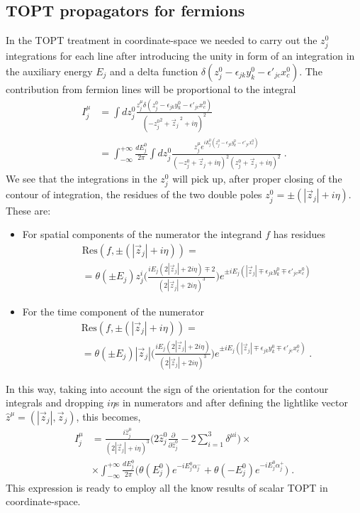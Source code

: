 \documentclass[%
 reprint,
 amsmath,amssymb,
 aps,
]{revtex4-1}
\begin{document}
\subsection{TOPT propagators for fermions}
In the TOPT treatment in coordinate-space we needed to carry out the $z^0_j$ integrations for each line after introducing the unity in form of an integration in the auxiliary energy $E_j$ and a delta function $\delta(z_j^0-\epsilon_{jk} y_k^0-\epsilon'_{jc}x_c^0)$. The contribution from fermion lines will be proportional to the integral
 \begin{align}
 I^\mu_j&=\int dz^0_{j}\frac{z_j^\mu\delta(z_{j}^0-\epsilon_{jk}y_k^0-\epsilon'_{jc}x^0_c)}{(-{z_{j}^0}^2+{\vec{z}_j}^{\;2}+i\eta)^2}\nonumber\\
 &=\int_{-\infty}^{+\infty}\frac{dE^0_j}{2\pi}\int dz^0_{j}\frac{z_j^\mu e^{iE^0_j(z_{j}^0-\epsilon_{jk}y^0_k-\epsilon'_{jc}x^0_c)}}{(-{z_{j}^0}+{\vec{z}_j}+i\eta)^2({z_{j}^0}+{\vec{z}_j}+i\eta)^2}\;.
\end{align}
We see that the integrations in the $z_j^0$ will pick up, after proper closing of the contour of integration, the residues of the two double poles $z_j^0=\pm(|\vec{z}_j|+i\eta)$. These are:
\begin{itemize}
\item For spatial components of the numerator the integrand $f$ has residues
\begin{align}
&\text{Res}(f,\pm(|\vec{z}_j|+i\eta))=\nonumber\\
&=\theta(\pm E_j)z_j^i\Big(\frac{iE_j(2|\vec{z}_j|+2i\eta)\mp2}{(2|\vec{z}_j|+2i\eta)^3}\Big)e^{\pm iE_j(|\vec{z}_j|\mp\epsilon_{jk}y_k^0\mp\epsilon'_{jc}x^0_c)}
\end{align}
\item For the time component of the numerator 
\begin{align}
&\text{Res}(f,\pm(|\vec{z}_j|+i\eta))=\nonumber\\
&=\theta(\pm E_j)|\vec{z}_j|\Big(\frac{iE_j(2|\vec{z}_j|+2i\eta)}{(2|\vec{z}_j|+2i\eta)^3}\Big)e^{\pm iE_j(|\vec{z}_j|\mp\epsilon_{jk}y_k^0\mp\epsilon'_{jc}x^0_c)}\;.
\end{align}
\end{itemize}
In this way, taking into account the sign of the orientation for the contour integrals and dropping $i\eta$s in numerators and after defining the lightlike vector $\hat{z}^\mu=(|\vec{z}_j|,\vec{z}_j)$,
this becomes, 
 \begin{align}
 I^\mu_j&=\frac{i\hat{z}_j^\mu}{(2|\vec{z}_j|+i\eta)^3}\Big(2\hat{z}_j^0\frac{\partial}{\partial \hat{z}_j^0}-2\sum_{i=1}^3\delta^{\mu i}\Big)\nonumber\times\\
& \times\int_{-\infty}^{+\infty}\frac{dE^0_j}{2\pi} \Big({\theta (E^0_j)e^{-iE_j^0\alpha_j^-}+\theta (-E^0_j)e^{-iE_j^0\alpha_j^+}}\Big) \;.
\end{align}
This expression is ready to employ all the know results of scalar TOPT in coordinate-space.
\end{document}
